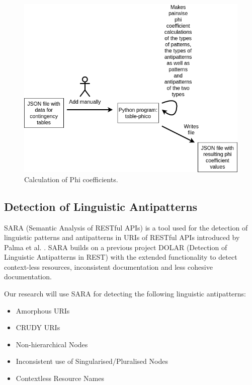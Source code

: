 \documentclass[a4paper,12pt]{article}
\begin{document}
\begin{figure}[ht!]
    \centering
    \includegraphics[scale=0.5]{Template_report_LaTeX_EN/img/method_figures/table_phico.png}
    \caption{Calculation of Phi coefficients.}
    \label{fig:Calculation of phi coefficients}
\end{figure}

\clearpage

\subsection{Detection of Linguistic Antipatterns}

SARA (Semantic Analysis of RESTful APIs) is a tool used for the detection of linguistic patterns and antipatterns in URIs of RESTful APIs introduced by Palma et al. \cite{linguistic}. SARA builds on a previous project DOLAR (Detection of Linguistic Antipatterns in REST) with the extended functionality to detect context-less resources, inconsistent documentation and less cohesive documentation.

Our research will use SARA \cite{linguistic} for detecting the following linguistic antipatterns:
\begin{itemize}
\item Amorphous URIs
\item CRUDY URIs
\item Non-hierarchical Nodes
\item Inconsistent use of Singularised/Pluralised Nodes
\item Contextless Resource Names
\end{itemize}
\end{document}
